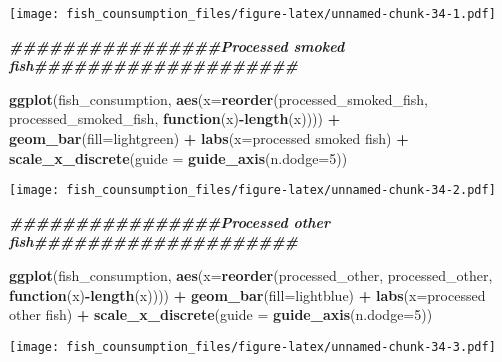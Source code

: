 \documentclass[
]{article}
\newenvironment{Shaded}{\begin{snugshade}}{\end{snugshade}}
\newcommand{\AttributeTok}[1]{\textcolor[rgb]{0.13,0.29,0.53}{#1}}
\newcommand{\ControlFlowTok}[1]{\textcolor[rgb]{0.13,0.29,0.53}{\textbf{#1}}}
\newcommand{\DecValTok}[1]{\textcolor[rgb]{0.00,0.00,0.81}{#1}}
\newcommand{\DocumentationTok}[1]{\textcolor[rgb]{0.56,0.35,0.01}{\textbf{\textit{#1}}}}
\newcommand{\FunctionTok}[1]{\textcolor[rgb]{0.13,0.29,0.53}{\textbf{#1}}}
\newcommand{\NormalTok}[1]{#1}
\newcommand{\SpecialCharTok}[1]{\textcolor[rgb]{0.81,0.36,0.00}{\textbf{#1}}}
\newcommand{\StringTok}[1]{\textcolor[rgb]{0.31,0.60,0.02}{#1}}
\begin{document}
\texttt{[image: fish\_counsumption\_files/figure-latex/unnamed-chunk-34-1.pdf]}

\begin{Shaded}
\begin{Highlighting}[]
\DocumentationTok{\#\#\#\#\#\#\#\#\#\#\#\#\#\#\#\#Processed smoked fish\#\#\#\#\#\#\#\#\#\#\#\#\#\#\#\#\#\#\#\#}

\FunctionTok{ggplot}\NormalTok{(fish\_consumption, }\FunctionTok{aes}\NormalTok{(}\AttributeTok{x=}\FunctionTok{reorder}\NormalTok{(processed\_smoked\_fish, processed\_smoked\_fish, }\ControlFlowTok{function}\NormalTok{(x)}\SpecialCharTok{{-}}\FunctionTok{length}\NormalTok{(x)))) }\SpecialCharTok{+}
  \FunctionTok{geom\_bar}\NormalTok{(}\AttributeTok{fill=}\StringTok{\textquotesingle{}lightgreen\textquotesingle{}}\NormalTok{) }\SpecialCharTok{+} 
  \FunctionTok{labs}\NormalTok{(}\AttributeTok{x=}\StringTok{\textquotesingle{}processed smoked fish\textquotesingle{}}\NormalTok{) }\SpecialCharTok{+}
  \FunctionTok{scale\_x\_discrete}\NormalTok{(}\AttributeTok{guide =} \FunctionTok{guide\_axis}\NormalTok{(}\AttributeTok{n.dodge=}\DecValTok{5}\NormalTok{))}
\end{Highlighting}
\end{Shaded}

\texttt{[image: fish\_counsumption\_files/figure-latex/unnamed-chunk-34-2.pdf]}

\begin{Shaded}
\begin{Highlighting}[]
\DocumentationTok{\#\#\#\#\#\#\#\#\#\#\#\#\#\#\#\#Processed other fish\#\#\#\#\#\#\#\#\#\#\#\#\#\#\#\#\#\#\#\#}

\FunctionTok{ggplot}\NormalTok{(fish\_consumption, }\FunctionTok{aes}\NormalTok{(}\AttributeTok{x=}\FunctionTok{reorder}\NormalTok{(processed\_other, processed\_other, }\ControlFlowTok{function}\NormalTok{(x)}\SpecialCharTok{{-}}\FunctionTok{length}\NormalTok{(x)))) }\SpecialCharTok{+}
  \FunctionTok{geom\_bar}\NormalTok{(}\AttributeTok{fill=}\StringTok{\textquotesingle{}lightblue\textquotesingle{}}\NormalTok{) }\SpecialCharTok{+} 
  \FunctionTok{labs}\NormalTok{(}\AttributeTok{x=}\StringTok{\textquotesingle{}processed other fish\textquotesingle{}}\NormalTok{) }\SpecialCharTok{+}
  \FunctionTok{scale\_x\_discrete}\NormalTok{(}\AttributeTok{guide =} \FunctionTok{guide\_axis}\NormalTok{(}\AttributeTok{n.dodge=}\DecValTok{5}\NormalTok{))}
\end{Highlighting}
\end{Shaded}

\texttt{[image: fish\_counsumption\_files/figure-latex/unnamed-chunk-34-3.pdf]}
\end{document}
